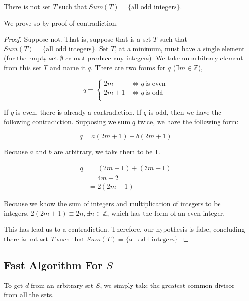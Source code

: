 \documentclass[12pt]{scrartcl}
\begin{document}
\begin{theorem}
    There is not set $T$ such that $Sum(T) = \{ \text{all odd integers} \}$.
\end{theorem}

We prove so by proof of contradiction.

\begin{proof}
    Suppose not. That is, suppose that is a set $T$ such that $Sum(T) = \{ \text{all odd integers} \}$. Set $T$, at a minimum, must have a single element (for the empty set $\emptyset$ cannot produce any integers). We take an arbitrary element from this set $T$ and name it $q$. There are two forms for $q$ ($\exists m \in \mathbb{Z}$),

\[
    q = \left.
        \begin{cases}
            2m & \Leftrightarrow q\ \text{is even} \\
            2m + 1 & \Leftrightarrow q\ \text{is odd} \\
        \end{cases}
        \right.
\]

If $q$ is even, there is already a contradiction. If $q$ is odd, then we have the following contradiction. Supposing we sum $q$ twice, we have the following form:

\begin{equation*}
    q = a(2m + 1) + b(2m + 1)
\end{equation*}

Because $a$ and $b$ are arbitrary, we take them to be $1$.

\begin{align*}
    q &= (2m + 1) + (2m + 1) \\
      &= 4m + 2 \\
      &= 2(2m + 1)
\end{align*}

Because we know the sum of integers and multiplication of integers to be integers, $2(2m + 1) \equiv 2n, \exists n \in \mathbb{Z}$, which has the form of an even integer.

This has lead us to a contradiction. Therefore, our hypothesis is false, concluding there is not set $T$ such that $Sum(T) = \{ \text{all odd integers} \}$.

\end{proof}

\subsection{Fast Algorithm For $S$}
To get $d$ from an arbitrary set $S$, we simply take the greatest common divisor from all the sets.
\end{document}
